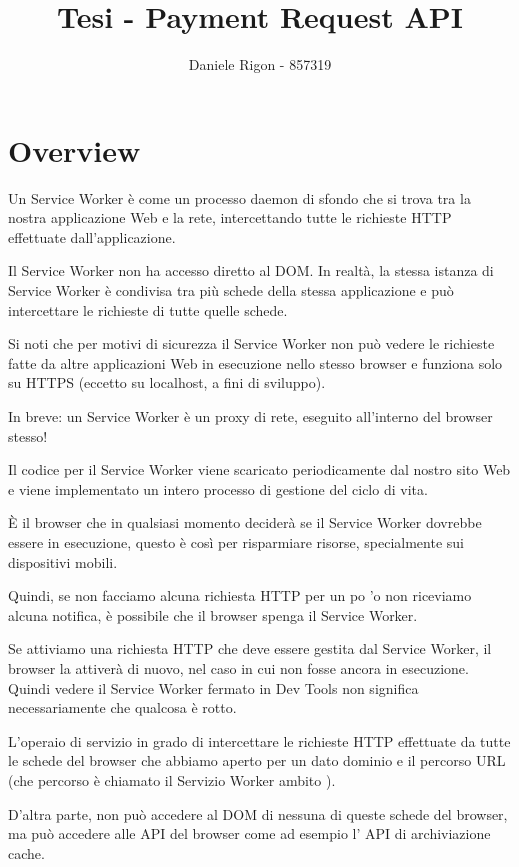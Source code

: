 \documentclass[italian]{article}
\author{
	Daniele Rigon - 857319 \\
}
\begin{document}
\title{Tesi - Payment Request API}
\maketitle

\tableofcontents
\pagebreak

\section{Overview}
Un Service Worker è come un processo daemon di sfondo che si trova tra la nostra applicazione Web e la rete, intercettando tutte le richieste HTTP effettuate dall'applicazione.

Il Service Worker non ha accesso diretto al DOM. In realtà, la stessa istanza di Service Worker è condivisa tra più schede della stessa applicazione e può intercettare le richieste di tutte quelle schede.

Si noti che per motivi di sicurezza il Service Worker non può vedere le richieste fatte da altre applicazioni Web in esecuzione nello stesso browser e funziona solo su HTTPS (eccetto su localhost, a fini di sviluppo).

In breve: un Service Worker è un proxy di rete, eseguito all'interno del browser stesso!

Il codice per il Service Worker viene scaricato periodicamente dal nostro sito Web e viene implementato un intero processo di gestione del ciclo di vita.

È il browser che in qualsiasi momento deciderà se il Service Worker dovrebbe essere in esecuzione, questo è così per risparmiare risorse, specialmente sui dispositivi mobili.

Quindi, se non facciamo alcuna richiesta HTTP per un po 'o non riceviamo alcuna notifica, è possibile che il browser spenga il Service Worker.

Se attiviamo una richiesta HTTP che deve essere gestita dal Service Worker, il browser la attiverà di nuovo, nel caso in cui non fosse ancora in esecuzione. Quindi vedere il Service Worker fermato in Dev Tools non significa necessariamente che qualcosa è rotto.

L'operaio di servizio in grado di intercettare le richieste HTTP effettuate da tutte le schede del browser che abbiamo aperto per un dato dominio e il percorso URL (che percorso è chiamato il Servizio Worker ambito ).

D'altra parte, non può accedere al DOM di nessuna di queste schede del browser, ma può accedere alle API del browser come ad esempio l' API di archiviazione cache.
\end{document}
